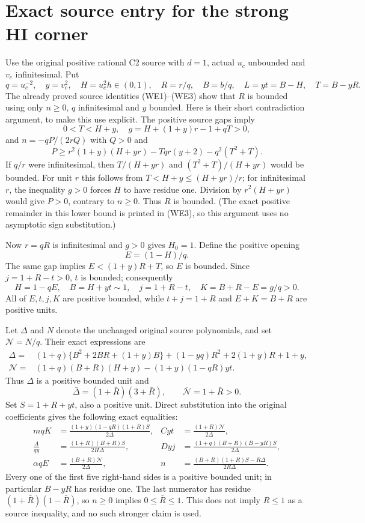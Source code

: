 \section{\texorpdfstring{Exact source entry for the strong HI corner}{Exact source entry for the strong HI corner}}
\label{component:p54b8f20ad2dd}

Use the original positive rational C2 source with $d=1$, actual
$u_c$ unbounded and $v_c$ infinitesimal. Put
\[
 q=u_c^{-2},\quad y=v_c^2,\quad H=u_c^2h\in(0,1),
 \quad R=r/q,\quad B=b/q,\quad L=yt=B-H,\quad T=B-yR.
\]
The already proved source identities (WE1)--(WE3) show that $R$ is
bounded using only $n\geq0$, $q$ infinitesimal and $y$ bounded.
Here is their short contradiction argument, to make this use
explicit. The positive source gaps imply
\[
 0<T<H+y,\quad g=H+(1+y)r-1+qT>0,
\]
and $n=-qP/(2rQ)$ with $Q>0$ and
\[
 P\ge r^2(1+y)(H+yr)-Tqr(y+2)-q^2(T^2+T).
\]
If $q/r$ were infinitesimal, then $T/(H+yr)$ and
$(T^2+T)/(H+yr)$ would be bounded. For unit $r$ this follows
from $T<H+y\le(H+yr)/r$; for infinitesimal $r$, the inequality
$g>0$ forces $H$ to have residue one. Division by $r^2(H+yr)$
would give $P>0$, contrary to $n\geq0$. Thus $R$ is bounded.
(The exact positive remainder in this lower bound is printed in
(WE3), so this argument uses no asymptotic sign substitution.)

Now $r=qR$ is infinitesimal and $g>0$ gives $H_0=1$.
Define the positive opening
\[
 E=(1-H)/q.
\]
The same gap implies
$E<(1+y)R+T$, so $E$ is bounded. Since $j=1+R-t>0$,
$t$ is bounded; consequently
\[
 H=1-qE,\quad B=H+yt\sim1,\quad
 j=1+R-t,\quad K=B+R-E=g/q>0.
\]
All of $E,t,j,K$ are positive bounded, while
$t+j=1+R$ and $E+K=B+R$ are positive units.

Let $\Delta$ and $N$ denote the unchanged original source
polynomials, and set $\mathcal N=N/q$. Their exact expressions are
\begin{align*}
\Delta={}&(1+q)\{B^2+2BR+(1+y)B\}
 +(1-yq)R^2+2(1+y)R+1+y,\\
\mathcal N={}&(1+q)(B+R)(H+y)-(1+y)(1-qR)yt.
\end{align*}
Thus $\Delta$ is a positive bounded unit and
\[
 \bar\Delta=(1+\bar R)(3+\bar R),\qquad
 \overline{\mathcal N}=1+\bar R>0.
\]
Set $S=1+R+yt$, also a positive unit. Direct substitution into
the original coefficients gives the following exact equalities:
\[
\begin{aligned}
 mqK&=\frac{(1+y)(1-qR)(1+R)S}{2\Delta},&
 Cyt&=\frac{(1+R)\mathcal N}{2\Delta},\\
 \frac{A}{qy}&=\frac{(1+R)(B+R)S}{2H\Delta},&
 Dyj&=\frac{(1+q)(B+R)(B-yR)S}{2\Delta},\\
 \alpha qE&=\frac{(B+R)\mathcal N}{2\Delta},&
 n&=\frac{(B+R)(1+R)S-R\Delta}{2R\Delta}.
\end{aligned}                                                   \tag{HI-entry}
\]
Every one of the first five right-hand sides is a positive bounded
unit; in particular $B-yR$ has residue one. The last numerator has
residue $(1+\bar R)(1-\bar R)$, so $n\geq0$ implies
$0\le\bar R\le1$. This does not imply $R\le1$ as a source
inequality, and no such stronger claim is used.

